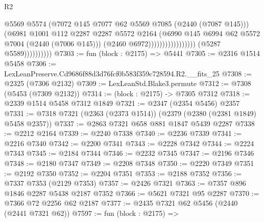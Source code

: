 \begin{lexlean}{R2}
\begin{coremodule}
                                                    @5569
                                                    @5574
                                                    (@7072
                                                      @145
                                                      @7077
                                                      @62
                                                      @5569
                                                      @7085
                                                      (@2440 (@7087 @145)))
                                                    (@6981
                                                      @1001
                                                      @112
                                                      @2287
                                                      @2287
                                                      @5572
                                                      @2164
                                                      (@6990
                                                        @145
                                                        @6994
                                                        @62
                                                        @5572
                                                        @7004
                                                        (@2440 (@7006 @145)))
                                                      (@2460 @6972)))))))))))))))))
                      (@5287 @5589))))))))))
@7303 := fun (block : @2175) => @5441
@7305 := @2316 @1514 @5458
@7306 := LexLeanPreserve.Cd9686f88d3d76fcf0b583f359c728594.R2.__fits_25
@7308 := @2325 (@7306 @2132)
@7309 := LexLeanStd.Blake3.permute
@7312 := @7308 (@5453 (@7309 @2132))
@7314 := (block : @2175) -> @7305 @7312
@7318 := @2339 @1514 @5458 @7312 @1849
@7321 := @2347 (@2354 @5456) @2357
@7331 := @7318 @7321 (@2363 (@2373 @1514)) (@2379 (@2380 (@2381 @1849) @5458 @2357))
@7337 := @2863 @7321 @658 @881 @1847 @5439 @2287
@7338 := @2212 @2164
@7339 := @2240 @7338
@7340 := @2236 @7339
@7341 := @2216 @7340
@7342 := @2200 @7341
@7343 := @2228 @7342
@7344 := @2224 @7343
@7345 := @2184 @7344
@7346 := @2232 @7345
@7347 := @2196 @7346
@7348 := @2180 @7347
@7349 := @2208 @7348
@7350 := @2220 @7349
@7351 := @2192 @7350
@7352 := @2204 @7351
@7353 := @2188 @7352
@7356 := @7337 @7353 (@2129 @7353)
@7357 := @2426 @7321
@7363 := @7357 @896 @1846 @2287 @5438 @2187 @7352
@7366 := @5621 @7321 @95 @2287
@7370 := @7366 @72 @2256 @62 @2187
@7377 := @2435 @7321 @62 @5456 (@2440 (@2441 @7321 @62))
@7597 := fun (block : @2175) =>

\end{coremodule}
\end{lexlean}
